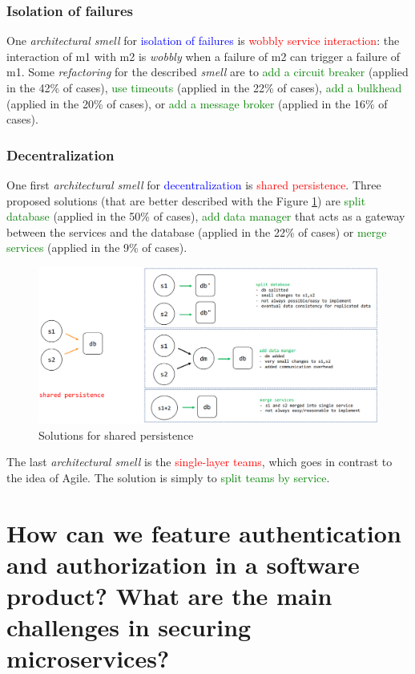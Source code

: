 \subsubsection{Isolation of failures}
One \textit{architectural smell} for \textcolor{blue}{isolation of failures} is \textcolor{red}{wobbly service interaction}: the interaction of m1 with m2 is \textit{wobbly} when a failure of m2 can trigger a failure of m1. Some \textit{refactoring} for the described \textit{smell} are to \textcolor{green}{add a circuit breaker} (applied in the 42\% of cases), \textcolor{green}{use timeouts} (applied in the 22\% of cases), \textcolor{green}{add a bulkhead} (applied in the 20\% of cases), or \textcolor{green}{add a message broker} (applied in the 16\% of cases).
\subsubsection{Decentralization}
One first \textit{architectural smell} for \textcolor{blue}{decentralization} is \textcolor{red}{shared persistence}. Three proposed solutions (that are better described with the Figure \ref{fig:shared_persistence}) are \textcolor{green}{split database} (applied in the 50\% of cases), \textcolor{green}{add data manager} that acts as a gateway between the services and the database (applied in the 22\% of cases) or \textcolor{green}{merge services} (applied in the 9\% of cases).
\begin{figure} [H]    \centering
    \includegraphics[width=1\textwidth]{images/shared_persistence.PNG}    \caption{Solutions for shared persistence}
    \label{fig:shared_persistence}\end{figure} 
The last \textit{architectural smell} is the \textcolor{red}{single-layer teams}, which goes in contrast to the idea of Agile. The solution is simply to \textcolor{green}{split teams by service}.


\section{How can we feature authentication and authorization in a software product? What are the main challenges in securing microservices?}
